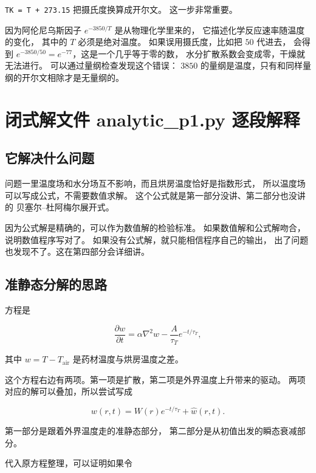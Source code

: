 \texttt{TK = T + 273.15} 把摄氏度换算成开尔文。
这一步非常重要。

因为阿伦尼乌斯因子 $e^{-3850/T}$ 是从物理化学里来的，
它描述化学反应速率随温度的变化，
其中的 $T$ 必须是绝对温度。
如果误用摄氏度，比如把 $50$ 代进去，
会得到 $e^{-3850/50}=e^{-77}$，这是一个几乎等于零的数，
水分扩散系数会变成零，干燥就无法进行。
可以通过量纲检查发现这个错误：
$3850$ 的量纲是温度，只有和同样量纲的开尔文相除才是无量纲的。

\section{闭式解文件 analytic\_p1.py 逐段解释}

\subsection{它解决什么问题}

问题一里温度场和水分场互不影响，而且烘房温度恰好是指数形式，
所以温度场可以写成公式，不需要数值求解。
这个公式就是第一部分没讲、第二部分也没讲的
贝塞尔--杜阿梅尔展开式。

因为公式解是精确的，可以作为数值解的检验标准。
如果数值解和公式解吻合，说明数值程序写对了。
如果没有公式解，就只能相信程序自己的输出，
出了问题也发现不了。这在第四部分会详细讲。

\subsection{准静态分解的思路}

方程是

\begin{equation}
\frac{\partial w}{\partial t}=\alpha\nabla^2w-\frac{A}{\tau_T}e^{-t/\tau_T},
\end{equation}

其中 $w=T-T_{\mathrm{air}}$ 是药材温度与烘房温度之差。

这个方程右边有两项。第一项是扩散，第二项是外界温度上升带来的驱动。
两项对应的解可以叠加，所以尝试写成

\begin{equation}
w(r,t)=W(r)e^{-t/\tau_T}+\hat w(r,t).
\end{equation}

第一部分是跟着外界温度走的准静态部分，
第二部分是从初值出发的瞬态衰减部分。

代入原方程整理，可以证明如果令

